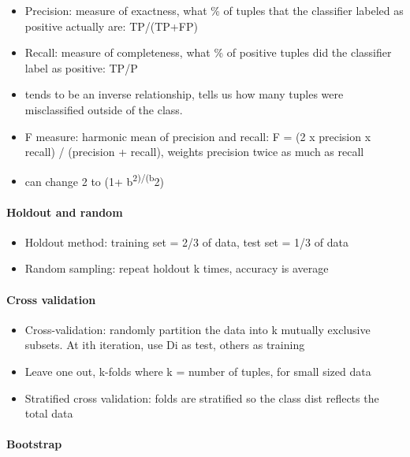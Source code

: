 \documentclass[11pt]{article}
\providecommand{\tightlist}{%
      \setlength{\itemsep}{0pt}\setlength{\parskip}{0pt}}
\begin{document}
    \begin{itemize}
\tightlist
\item
  Precision: measure of exactness, what \% of tuples that the classifier
  labeled as positive actually are: TP/(TP+FP)
\item
  Recall: measure of completeness, what \% of positive tuples did the
  classifier label as positive: TP/P
\item
  tends to be an inverse relationship, tells us how many tuples were
  misclassified outside of the class.
\item
  F measure: harmonic mean of precision and recall: F = (2 x precision x
  recall) / (precision + recall), weights precision twice as much as
  recall
\item
  can change 2 to (1+ b\textsuperscript{2)/(b}2)
\end{itemize}

    \paragraph{Holdout and random}\label{holdout-and-random}

    \begin{itemize}
\tightlist
\item
  Holdout method: training set = 2/3 of data, test set = 1/3 of data
\item
  Random sampling: repeat holdout k times, accuracy is average
\end{itemize}

    \paragraph{Cross validation}\label{cross-validation}

    \begin{itemize}
\tightlist
\item
  Cross-validation: randomly partition the data into k mutually
  exclusive subsets. At ith iteration, use Di as test, others as
  training
\item
  Leave one out, k-folds where k = number of tuples, for small sized
  data
\item
  Stratified cross validation: folds are stratified so the class dist
  reflects the total data
\end{itemize}

    \paragraph{Bootstrap}\label{bootstrap}
\end{document}
